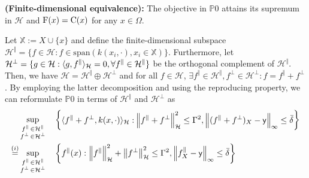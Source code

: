 \begin{theorem}
	 \label{thm.main}
	 {\normalfont \textbf{(Finite-dimensional equivalence):}}
	The objective in $\mathds{P}0$ attains its supremum in $\mathcal{H}$ and ${\normalfont \text{F}}(x) = {\normalfont \text{C}}(x)$ for any $x \in \Omega$.
\end{theorem}

\begin{my_proof}
	\label{app.thmproof}
	Let $\mathds{X} := X \cup \{x\}$ and define the finite-dimensional subspace $\mathcal{H}^\Vert=\{f\in\mathcal{H}: f \in \text{span}(k(x_i,\cdot), x_i \in \mathds{X})\}$. Furthermore, let $\mathcal{H}^\perp = \{g\in \mathcal{H}: \langle g, f^\Vert \rangle_\mathcal{H}=0, \forall f^\Vert \in \mathcal{H}^{\Vert} \}$ be the orthogonal complement of $\mathcal{H}^{\Vert}$. Then, we have $\mathcal{H}=\mathcal{H}^{\Vert} \oplus \mathcal{H}^\perp$ and for all $f\in \mathcal{H}$, $\exists f^{\Vert} \in \mathcal{H}^{\Vert}, f^\perp \in \mathcal{H}^\perp : f = f^{\Vert} + f^\perp$. By employing the latter decomposition and using the reproducing property, we can reformulate $\mathds{P}0$ in terms of $\mathcal{H}^{\Vert}$ and $\mathcal{H}^\perp$ as
	\begin{align}
		& \sup_{\substack{f^{\Vert} \, \in \mathcal{H}^{\Vert} \\ f^\perp \, \in \mathcal{H}^\perp}} &&\left\{ 
		\begin{aligned}
			&\rkinner{f^{\Vert}+f^\perp}{k(x,\cdot)} : \hspace{-8pt}&\rknorm{f^{\Vert}+f^\perp}^2 \leq \Gamma^2, \infnorm{(f^{\Vert}+f^\perp)_X - \mathsf{y}} \leq \bar \delta 
		\end{aligned}
		\right\} 
		\\
		\overset{(i)}{=}& \sup_{\substack{f^{\Vert} \, \in \mathcal{H}^{\Vert} \\ f^\perp \, \in \mathcal{H}^\perp}} &&\left\{ f^{\Vert}(x) : \rknorm{f^{\Vert}}^2+\rknorm{f^\perp}^2 \leq \Gamma^2, \infnorm{f_{X}^\Vert - \mathsf{y}} \leq \bar \delta \right\} \\

\end{align}
\end{my_proof}
